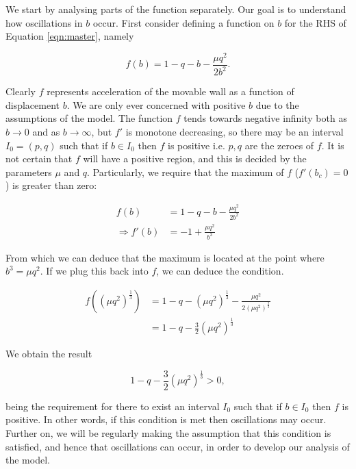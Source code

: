 \documentclass{article}
\begin{document}
We start by analysing parts of the function separately.
Our goal is to understand how oscillations in $b$ occur.
First consider defining a function on $b$ for the RHS of Equation \ref{eqn:master},
namely

\begin{equation}
    f(b) = 1 - q - b - \frac{\mu q^2}{2b^2}.
\end{equation}

Clearly $f$ represents acceleration of the movable wall as a function of displacement $b$.
We are only ever concerned with positive $b$ due to the assumptions of the model.
The function $f$ tends towards negative infinity both as $b\rightarrow 0$ and as $b\rightarrow\infty$,
but $f'$ is monotone decreasing, so there may be an interval $I_0=(p,q)$ such that if $b\in I_0$
then $f$ is positive i.e. $p,q$ are the zeroes of $f$.
It is not certain that $f$ will have a positive region,
and this is decided by the parameters $\mu$ and $q$.
Particularly, we require that the maximum of $f$ ($f'(b_c) = 0$) is greater than zero:


\begin{align}
    f(b) &= 1 - q - b - \frac{\mu q^2}{2b^2} \\
    \Rightarrow f'(b) &= -1 + \frac{\mu q^2}{b^3}
\end{align}

From which we can deduce that the maximum is located at the point where $b^3 = \mu q^2$.
If we plug this back into $f$, we can deduce the condition.

\begin{align*}
    f((\mu q^2)^{\frac{1}{3}}) &= 1 - q - (\mu q^2)^{\frac{1}{3}} - \frac{\mu q^2}{2(\mu q^2)^{\frac{2}{3}}} \\
    &= 1 - q - \frac{3}{2}(\mu q^2)^{\frac{1}{3}}
\end{align*}

We obtain the result

\begin{equation}
    1 - q - \frac{3}{2}(\mu q^2)^{\frac{1}{3}} > 0,
    \label{eqn:osc_condition}
\end{equation}

being the requirement for there to exist an interval $I_0$
such that if $b\in I_0$ then $f$ is positive.
In other words, if this condition is met then oscillations may occur.
Further on, we will be regularly making the assumption that this condition is satisfied,
and hence that oscillations can occur,
in order to develop our analysis of the model.
\end{document}
